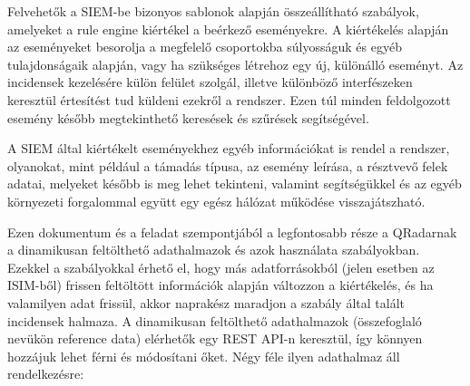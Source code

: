 Felvehetők a SIEM-be bizonyos sablonok alapján összeállítható szabályok, amelyeket a rule engine kiértékel a beérkező eseményekre. A kiértékelés alapján az eseményeket besorolja a megfelelő csoportokba súlyosságuk és egyéb tulajdonságaik alapján, vagy ha szükséges létrehoz egy új, különálló eseményt. Az incidensek kezelésére külön felület szolgál, illetve különböző interfészeken keresztül értesítést tud küldeni ezekről a rendszer. Ezen túl minden feldolgozott esemény később megtekinthető keresések és szűrések segítségével.

A SIEM által kiértékelt eseményekhez egyéb információkat is rendel a rendszer, olyanokat, mint például a támadás típusa, az esemény leírása, a résztvevő felek adatai, melyeket később is meg lehet tekinteni, valamint segítségükkel és az egyéb környezeti forgalommal együtt egy egész hálózat működése visszajátszható.
	
	
 
\label{lbl:reference_data}
Ezen dokumentum és a feladat szempontjából a legfontosabb része a QRadarnak a dinamikusan feltölthető adathalmazok és azok használata szabályokban. Ezekkel a szabályokkal érhető el, hogy más adatforrásokból (jelen esetben az ISIM-ből) frissen feltöltött információk alapján változzon a kiértékelés, és ha valamilyen adat frissül, akkor naprakész maradjon a szabály által talált incidensek halmaza. A dinamikusan feltölthető adathalmazok (összefoglaló nevükön reference data) elérhetők egy REST API-n keresztül, így könnyen hozzájuk lehet férni és módosítani őket. Négy féle ilyen adathalmaz áll rendelkezésre:

